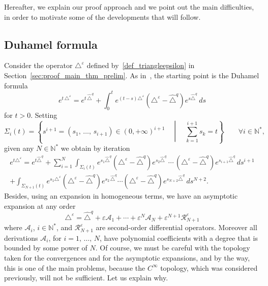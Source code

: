 \documentclass[AHL,Unicode,published]{cedram}
\newcommand*\N{\mathbb{N}}
\newcommand{\calA}{\mathcal{A}}
\newcommand{\calR}{\mathcal{R}}
\let\oldforall\forall
\renewcommand*{\forall}{\mathrel{\oldforall}}
\begin{document}
Hereafter, we explain our proof approach and we point out the main difficulties, in order to motivate some of the developments that will follow.

\subsection{Duhamel formula}\label{sec_duh}
Consider the operator $\triangle^\varepsilon$ defined by~\eqref{def_triangleepsilon} in Section~\ref{sec:proof_main_thm_prelim}. As in~\cite{Ba-13}, the starting point is the Duhamel formula
\[
e^{t\,\triangle^\varepsilon} = e^{t\,\widehat{\triangle}^{q}} + \int_0^t e^{(t-s)\triangle^\varepsilon}\left(\triangle^\varepsilon-\widehat{\triangle}^{q}\right)e^{s \widehat{\triangle}^{q}}\, ds
\]
for $t>0$. Setting
\[
\Sigma_i(t) = \left\{ s^{i+1} = (s_1,\,\ldots,\,s_{i+1})\in(0,+\infty)^{i+1}\quad \middle|\quad \sum_{k=1}^{i+1} s_k = t \right\} \qquad \forall i\in\N^*,
\]
given any $N\in\N^*$ we obtain by iteration
\begin{multline}\label{rough_duh1}
e^{t\triangle^{\varepsilon}} = e^{t \widehat{\triangle}^{q}} + \sum_{i=1}^N \int_{\Sigma_i(t)} e^{s_1 \widehat{\triangle}^{q}} \left(\triangle^{\varepsilon} - \widehat{\triangle}^{q}\right) e^{s_2 \widehat{\triangle}^{q}}\,\cdots\,\left(\triangle^{\varepsilon} - \widehat{\triangle}^{q}\right) e^{s_{i+1} \widehat{\triangle}^{q}} \, ds^{i+1} \\
+ \int_{\Sigma_{N+1}(t)} e^{s_1 \triangle^\varepsilon} \left(\triangle^{\varepsilon} - \widehat{\triangle}^{q}\right) e^{s_2 \,\widehat{\triangle}^{q}} \cdots \left(\triangle^{\varepsilon} - \widehat{\triangle}^{q}\right) e^{s_{N+2} \widehat{\triangle}^{q}} \, ds^{N+2}.
\end{multline}
Besides, using an expansion in homogeneous terms, we have an asymptotic expansion at any order
\begin{equation}\label{expansionaaa}
\triangle^\varepsilon = \widehat{\triangle}^{q} + \varepsilon \calA_1 + \cdots + \varepsilon^N\calA_N + \varepsilon^{N+1}\calR_{N+1}^\varepsilon
\end{equation}
where $\calA_i$, $i\in\N^*$, and $\calR_{N+1}^\varepsilon$ are second-order differential operators. Moreover all derivations $\calA_i$, for $i=1,\,\ldots,\,N$, have polynomial coefficients with a degree that is bounded by some power of $N$. Of course, we must be careful with the topology taken for the convergences and for the asymptotic expansions, and by the way, this is one of the main problems, because the $C^\infty$ topology, which was considered previously, will not be sufficient. Let us explain why.
\end{document}
